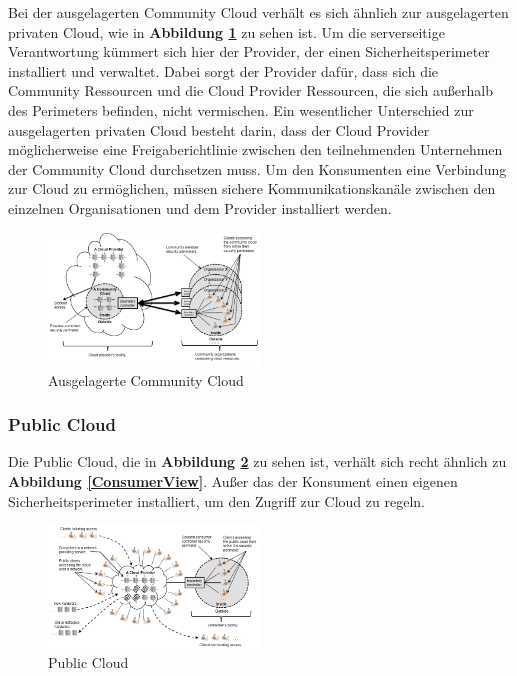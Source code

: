 Bei der ausgelagerten Community Cloud verhält es sich ähnlich zur ausgelagerten privaten Cloud, wie in \textbf{Abbildung \ref{OutSourcedCommunityCloud}} zu sehen ist.
Um die serverseitige Verantwortung kümmert sich hier der Provider, der einen Sicherheitsperimeter installiert und verwaltet. Dabei sorgt der Provider dafür, dass sich 
die Community Ressourcen und die Cloud Provider Ressourcen, die sich außerhalb des Perimeters befinden, nicht vermischen. Ein wesentlicher Unterschied zur ausgelagerten privaten Cloud
besteht darin, dass der Cloud Provider möglicherweise eine Freigaberichtlinie zwischen den teilnehmenden Unternehmen der Community Cloud durchsetzen muss. 
Um den Konsumenten eine Verbindung zur Cloud zu ermöglichen, müssen sichere Kommunikationskanäle zwischen den einzelnen Organisationen und 
dem Provider installiert werden\cite{Badger}.

\begin{figure}[H]
    \centering
	\includegraphics[width=0.5\textwidth]{Images/OutSourcedCommunityCloud}
	\caption{Ausgelagerte Community Cloud \cite{Badger}}
	\label{OutSourcedCommunityCloud}
\end{figure}

\subsubsection{Public Cloud}

Die Public Cloud, die in \textbf{Abbildung \ref{PublicCloud}} zu sehen ist, verhält sich recht ähnlich zu \textbf{Abbildung \ref{ConsumerView}}.
Außer das der Konsument einen eigenen Sicherheitsperimeter installiert, um den Zugriff zur Cloud zu regeln.

 
\begin{figure}[H]
    \centering
	\includegraphics[width=0.5\textwidth]{Images/PublicCloud}
	\caption{Public Cloud \cite{Badger}}
	\label{PublicCloud}
\end{figure}

